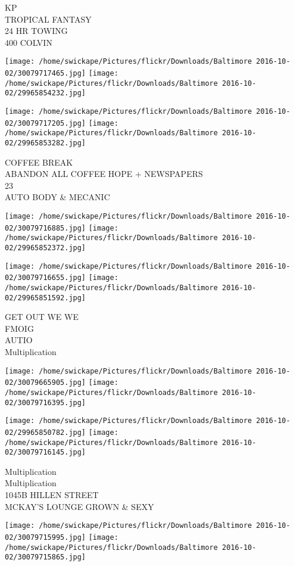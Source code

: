 \documentclass[10pt,letterpaper]{article}
\begin{document}
KP\\
TROPICAL FANTASY\\
24 HR TOWING\\
400 COLVIN
\pagebreak

\texttt{[image: /home/swickape/Pictures/flickr/Downloads/Baltimore 2016-10-02/30079717465.jpg]}
\texttt{[image: /home/swickape/Pictures/flickr/Downloads/Baltimore 2016-10-02/29965854232.jpg]}

\texttt{[image: /home/swickape/Pictures/flickr/Downloads/Baltimore 2016-10-02/30079717205.jpg]}
\texttt{[image: /home/swickape/Pictures/flickr/Downloads/Baltimore 2016-10-02/29965853282.jpg]}

COFFEE BREAK\\
ABANDON ALL COFFEE HOPE + NEWSPAPERS\\
23\\
AUTO BODY \& MECANIC
\pagebreak

\texttt{[image: /home/swickape/Pictures/flickr/Downloads/Baltimore 2016-10-02/30079716885.jpg]}
\texttt{[image: /home/swickape/Pictures/flickr/Downloads/Baltimore 2016-10-02/29965852372.jpg]}

\texttt{[image: /home/swickape/Pictures/flickr/Downloads/Baltimore 2016-10-02/30079716655.jpg]}
\texttt{[image: /home/swickape/Pictures/flickr/Downloads/Baltimore 2016-10-02/29965851592.jpg]}

GET OUT WE WE\\
FMOIG\\
AUTIO\\
Multiplication
\pagebreak

\texttt{[image: /home/swickape/Pictures/flickr/Downloads/Baltimore 2016-10-02/30079665905.jpg]}
\texttt{[image: /home/swickape/Pictures/flickr/Downloads/Baltimore 2016-10-02/30079716395.jpg]}

\texttt{[image: /home/swickape/Pictures/flickr/Downloads/Baltimore 2016-10-02/29965850782.jpg]}
\texttt{[image: /home/swickape/Pictures/flickr/Downloads/Baltimore 2016-10-02/30079716145.jpg]}

Multiplication\\
Multiplication\\
1045B HILLEN STREET\\
MCKAY'S LOUNGE GROWN \& SEXY
\pagebreak

\texttt{[image: /home/swickape/Pictures/flickr/Downloads/Baltimore 2016-10-02/30079715995.jpg]}
\texttt{[image: /home/swickape/Pictures/flickr/Downloads/Baltimore 2016-10-02/30079715865.jpg]}
\end{document}
